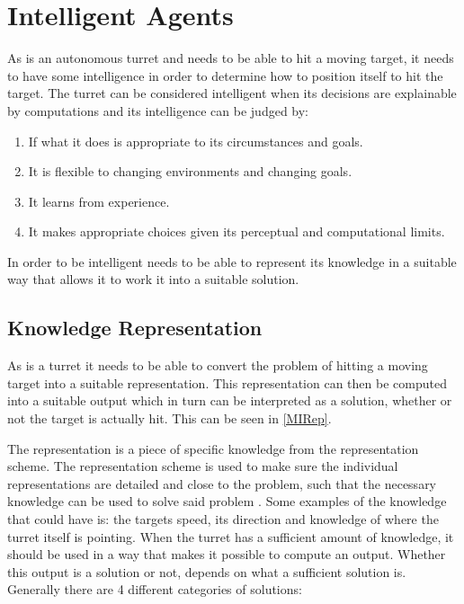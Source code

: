 \section{Intelligent Agents}
 
As \name is an autonomous turret and needs to be able to hit a moving target,
it needs to have some intelligence in order to determine how to position itself
to hit the target. The turret can be considered intelligent
\citep[ch.1.1]{MIBook} when its decisions are explainable by computations and
its intelligence can be judged by:

\begin{enumerate}
  \item If what it does is appropriate to its circumstances and goals.
  \item It is flexible to changing environments and changing goals.
  \item It learns from experience.
  \item It makes appropriate choices given its perceptual and computational
  limits.
\end{enumerate}

In order to be intelligent \namep needs to be able to represent its knowledge in
a suitable way that allows it to work it into a suitable solution. 

\subsection{Knowledge Representation}\label{KR}

As \namep is a turret it needs to be able to convert the problem of hitting a
moving target into a suitable representation. This representation can then be
computed into a suitable output which in turn can be interpreted as
a solution, whether or not the target is actually hit. This can be seen in
\autoref{MIRep}.


The representation is a piece of specific knowledge from the representation
scheme. The representation scheme is used to make sure the individual
representations are detailed and close to the problem, such that the necessary
knowledge can be used to solve said problem \citep{MIBook}. Some examples of the
knowledge that \name could have is: the targets speed, its direction and
knowledge of where the turret itself is pointing. When the turret has a
sufficient amount of knowledge, it should be used in a way that makes it
possible to compute an output. Whether this output is a solution or not, depends
on what a sufficient solution is. Generally there are 4 different categories of
solutions:


